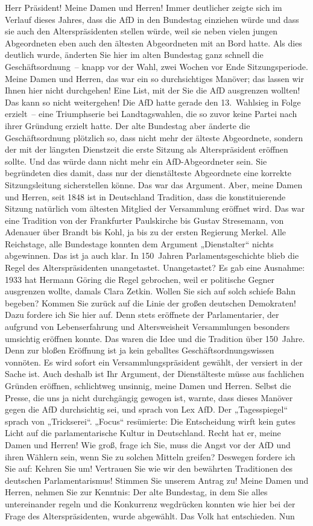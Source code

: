 \documentclass[10pt, a4paper]{report}
\begin{document}
Herr Präsident! Meine Damen und Herren! Immer deutlicher zeigte sich im Verlauf dieses Jahres, dass die AfD in den Bundestag einziehen würde und dass sie auch den Alterspräsidenten stellen würde, weil sie neben vielen jungen Abgeordneten eben auch den ältesten Abgeordneten mit an Bord hatte. Als dies deutlich wurde, änderten Sie hier im alten Bundestag ganz schnell die Geschäftsordnung – knapp vor der Wahl, zwei Wochen vor Ende Sitzungsperiode. Meine Damen und Herren, das war ein so durchsichtiges Manöver; das lassen wir Ihnen hier nicht durchgehen! Eine List, mit der Sie die AfD ausgrenzen wollten! Das kann so nicht weitergehen! Die AfD hatte gerade den 13. Wahlsieg in Folge erzielt – eine Triumphserie bei Landtagswahlen, die so zuvor keine Partei nach ihrer Gründung erzielt hatte. Der alte Bundestag aber änderte die Geschäftsordnung plötzlich so, dass nicht mehr der älteste Abgeordnete, sondern der mit der längsten Dienstzeit die erste Sitzung als Alterspräsident eröffnen sollte. Und das würde dann nicht mehr ein AfD-Abgeordneter sein. Sie begründeten dies damit, dass nur der dienstälteste Abgeordnete eine korrekte Sitzungsleitung sicherstellen könne. Das war das Argument. Aber, meine Damen und Herren, seit 1848 ist in Deutschland Tradition, dass die konstituierende Sitzung natürlich vom ältesten Mitglied der Versammlung eröffnet wird. Das war eine Tradition von der Frankfurter Paulskirche bis Gustav Stresemann, von Adenauer über Brandt bis Kohl, ja bis zu der ersten Regierung Merkel. Alle Reichstage, alle Bundestage konnten dem Argument „Dienstalter“ nichts abgewinnen. Das ist ja auch klar. In 150 Jahren Parlamentsgeschichte blieb die Regel des Alterspräsidenten unangetastet. Unangetastet? Es gab eine Ausnahme: 1933 hat Hermann Göring die Regel gebrochen, weil er politische Gegner ausgrenzen wollte, damals Clara Zetkin. Wollen Sie sich auf solch schiefe Bahn begeben? Kommen Sie zurück auf die Linie der großen deutschen Demokraten! Dazu fordere ich Sie hier auf. Denn stets eröffnete der Parlamentarier, der aufgrund von Lebenserfahrung und Altersweisheit Versammlungen besonders umsichtig eröffnen konnte. Das waren die Idee und die Tradition über 150 Jahre. Denn zur bloßen Eröffnung ist ja kein geballtes Geschäftsordnungswissen vonnöten. Es wird sofort ein Versammlungspräsident gewählt, der versiert in der Sache ist. Auch deshalb ist Ihr Argument, der Dienstälteste müsse aus fachlichen Gründen eröffnen, schlichtweg unsinnig, meine Damen und Herren. Selbst die Presse, die uns ja nicht durchgängig gewogen ist, warnte, dass dieses Manöver gegen die AfD durchsichtig sei, und sprach von Lex AfD. Der „Tagesspiegel“ sprach von „Trickserei“. „Focus“ resümierte: Die Entscheidung wirft kein gutes Licht auf die parlamentarische Kultur in Deutschland. Recht hat er, meine Damen und Herren! Wie groß, frage ich Sie, muss die Angst vor der AfD und ihren Wählern sein, wenn Sie zu solchen Mitteln greifen? Deswegen fordere ich Sie auf: Kehren Sie um! Vertrauen Sie wie wir den bewährten Traditionen des deutschen Parlamentarismus! Stimmen Sie unserem Antrag zu! Meine Damen und Herren, nehmen Sie zur Kenntnis: Der alte Bundestag, in dem Sie alles untereinander regeln und die Konkurrenz wegdrücken konnten wie hier bei der Frage des Alterspräsidenten, wurde abgewählt. Das Volk hat entschieden. Nun 
\end{document}
